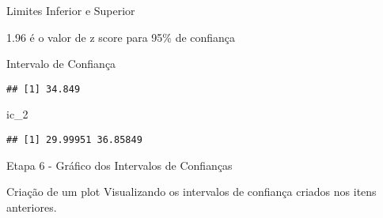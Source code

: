 \documentclass[]{article}
\newenvironment{Shaded}{\begin{snugshade}}{\end{snugshade}}
\newcommand{\DecValTok}[1]{\textcolor[rgb]{0.00,0.00,0.81}{#1}}
\newcommand{\FloatTok}[1]{\textcolor[rgb]{0.00,0.00,0.81}{#1}}
\newcommand{\KeywordTok}[1]{\textcolor[rgb]{0.13,0.29,0.53}{\textbf{#1}}}
\newcommand{\NormalTok}[1]{#1}
\newcommand{\OperatorTok}[1]{\textcolor[rgb]{0.81,0.36,0.00}{\textbf{#1}}}
\newcommand{\StringTok}[1]{\textcolor[rgb]{0.31,0.60,0.02}{#1}}
\begin{document}
\begin{Shaded}
\end{Shaded}

Limites Inferior e Superior

1.96 é o valor de z score para 95\% de confiança

\begin{Shaded}
\end{Shaded}

Intervalo de Confiança

\begin{Shaded}
\end{Shaded}

\begin{verbatim}
## [1] 34.849
\end{verbatim}

\begin{Shaded}
\begin{Highlighting}[]
\NormalTok{ic_}\DecValTok{2}
\end{Highlighting}
\end{Shaded}

\begin{verbatim}
## [1] 29.99951 36.85849
\end{verbatim}

Etapa 6 - Gráfico dos Intervalos de Confianças

Criação de um plot Visualizando os intervalos de confiança criados nos
itens anteriores.
\end{document}
